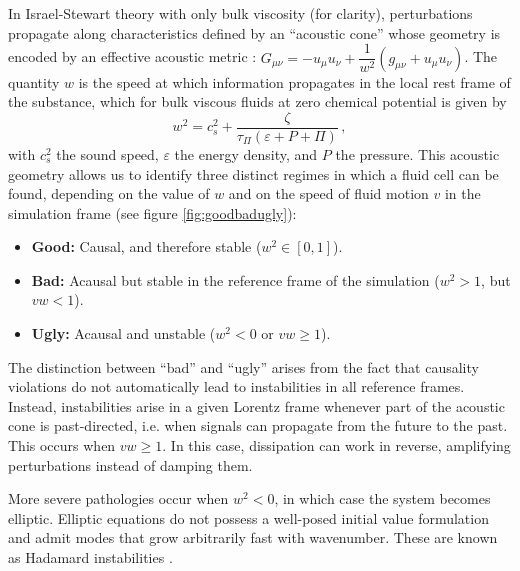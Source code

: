 \documentclass{webofc}
\begin{document}
 In Israel-Stewart theory with only bulk viscosity (for clarity), perturbations propagate along characteristics defined by an ``acoustic cone'' whose geometry is encoded by an effective acoustic metric \cite{Causality_bulk}: $G_{\mu \nu}=-u_\mu u_\nu +\dfrac{1}{w^2} (g_{\mu \nu}+u_\mu u_\nu)$.
The quantity \( w \) is the speed at which information propagates in the local rest frame of the substance, which for bulk viscous fluids at zero chemical potential is given by
\begin{equation}\label{wcs2}
w^2= c_s^2 +\dfrac{\zeta}{\tau_\Pi (\varepsilon+P+\Pi)} \, ,
\end{equation}
with $c_s^2$ the sound speed, $\varepsilon$ the energy density, and $P$ the pressure. This acoustic geometry allows us to identify three distinct regimes in which a fluid cell can be found, depending on the value of $w$ and on the speed of fluid motion $v$ in the simulation frame (see figure \ref{fig:goodbadugly}):
\begin{itemize}
    \item \textbf{Good:} Causal, and therefore stable (\( w^2 \in [0,1] \)).
    \item \textbf{Bad:} Acausal but stable in the reference frame of the simulation (\( w^2 > 1 \), but \( v w < 1 \)).
    \item \textbf{Ugly:} Acausal and unstable (\( w^2 < 0 \) or \( v w \geq 1 \)).
\end{itemize}
The distinction between ``bad'' and ``ugly'' arises from the fact that causality violations do not automatically lead to instabilities in all reference frames. Instead, instabilities arise in a given Lorentz frame whenever part of the acoustic cone is past-directed,  i.e. when signals can propagate from the future to the past. This occurs when \( v w \geq 1 \). In this case, dissipation can work in reverse, amplifying perturbations instead of damping them.


More severe pathologies occur when \( w^2 < 0 \), in which case the system becomes elliptic. Elliptic equations do not possess a well-posed initial value formulation and admit modes that grow arbitrarily fast with wavenumber. These are known as Hadamard instabilities \cite{Rauch_book}. 

\end{document}
